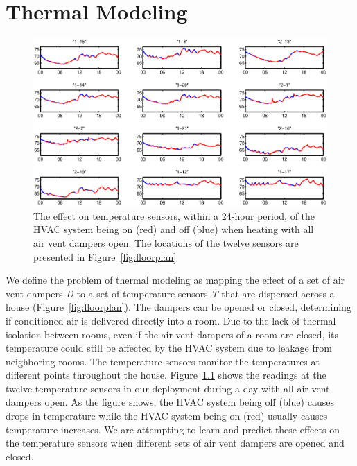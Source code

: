 \chapter{Thermal Modeling}

\begin{figure}
\begin{center}
\includegraphics[width=1\columnwidth]{fig/1daytemponoff.eps}
\end{center}
\caption[Effect of HVAC system on temperature sensors]{The effect on temperature
  sensors, within a 24-hour period, of the HVAC system being on (red) and off
  (blue) when heating with all air vent dampers open. The locations of the
  twelve sensors are presented in Figure~\ref{fig:floorplan}}
\label{fig:hvacOnOffAffect}
\end{figure}

We define the problem of thermal modeling as mapping the effect of a set of air
vent dampers {\em D} to a set of temperature sensors {\em T} that are dispersed
across a house (Figure~\ref{fig:floorplan}). The dampers can be opened or
closed, determining if conditioned air is delivered directly into a room. Due to
the lack of thermal isolation between rooms, even if the air vent dampers of a
room are closed, its temperature could still be affected by the HVAC system due
to leakage from neighboring rooms. The temperature sensors monitor the
temperatures at different points throughout the
house. Figure~\ref{fig:hvacOnOffAffect} shows the readings at the twelve
temperature sensors in our deployment during a day with all air vent dampers
open. As the figure shows, the HVAC system being off (blue) causes drops in
temperature while the HVAC system being on (red) usually causes temperature
increases. We are attempting to learn and predict these effects on the
temperature sensors when different sets of air vent dampers are opened and
closed. 

